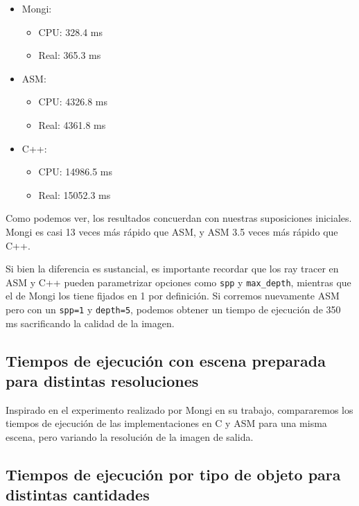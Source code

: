 \begin{itemize}
    \item Mongi:
        \begin{itemize}
            \item CPU: 328.4 ms
            \item Real: 365.3 ms
        \end{itemize}
    \item ASM:
        \begin{itemize}
            \item CPU: 4326.8 ms
            \item Real: 4361.8 ms
        \end{itemize}
    \item C++:
        \begin{itemize}
            \item CPU: 14986.5 ms
            \item Real: 15052.3 ms
        \end{itemize}
\end{itemize}

Como podemos ver, los resultados concuerdan con nuestras suposiciones iniciales.
Mongi es casi 13 veces más rápido que ASM, y ASM 3.5 veces más rápido que C++.

Si bien la diferencia es sustancial, es importante recordar que los ray tracer
en ASM y C++ pueden parametrizar opciones como \texttt{spp} y
\texttt{max\_depth}, mientras que el de Mongi los tiene fijados en 1 por
definición. Si corremos nuevamente ASM pero con un \texttt{spp=1} y
\texttt{depth=5}, podemos obtener un tiempo de ejecución de 350 ms sacrificando
la calidad de la imagen.


\subsection{Tiempos de ejecución con escena preparada para distintas
resoluciones}

Inspirado en el experimento realizado por Mongi en su trabajo, compararemos los
tiempos de ejecución de las implementaciones en C y ASM para una misma escena,
pero variando la resolución de la imagen de salida.


\subsection{Tiempos de ejecución por tipo de objeto para distintas cantidades}


